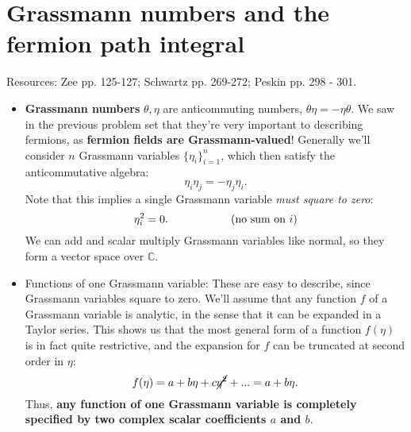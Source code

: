 \documentclass[12pt, oneside]{article}   	%
\theoremstyle{definition}
\begin{document}

%


\section*{Grassmann numbers and the fermion path integral}

Resources: Zee pp. 125-127; Schwartz pp. 269-272; Peskin pp. 298 - 301.

\begin{itemize}
	\item \textbf{Grassmann numbers} $\theta, \eta$ are anticommuting numbers, $\theta\eta = -\eta\theta$. We saw in the previous problem set that they're very important to describing fermions, as \textbf{fermion fields are Grassmann-valued}! Generally we'll consider $n$ Grassmann variables $\{\eta_i\}_{i = 1}^n$, which then satisfy the anticommutative algebra:
	\begin{equation}
		\eta_i\eta_j = -\eta_j\eta_i.
	\end{equation}
	Note that this implies a single Grassmann variable \textit{must square to zero}:
	\begin{equation}
		\eta_i^2 = 0.\hspace{2cm}(\textnormal{no sum on } i)
	\end{equation}
	We can add and scalar multiply Grassmann variables like normal, so they form a vector space over $\mathbb C$. 
	
	\item Functions of one Grassmann variable: These are easy to describe, since Grassmann variables square to zero. We'll assume that any function $f$ of a Grassmann variable is analytic, in the sense that it can be expanded in a Taylor series. This shows us that the most general form of a function $f(\eta)$ is in fact quite restrictive, and the expansion for $f$ can be truncated at second order in $\eta$:
	\begin{equation}
		f(\eta) = a + b\eta + c\cancel{\eta^2} + ... = a + b\eta.
	\end{equation}
	Thus, \textbf{any function of one Grassmann variable is completely specified by two complex scalar coefficients $a$ and $b$}. 
	

\end{itemize}
\end{document}
